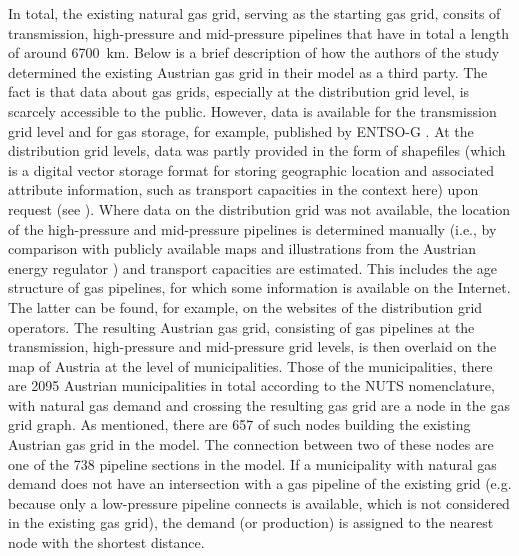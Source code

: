 In total, the existing natural gas grid, serving as the starting gas grid, consits of transmission, high-pressure and mid-pressure pipelines that have in total a length of around \SI{6700}{km}. Below is a brief description of how the authors of the study determined the existing Austrian gas grid in their model as a third party. The fact is that data about gas grids, especially at the distribution grid level, is scarcely accessible to the public. However, data is available for the transmission grid level and for gas storage, for example, published by ENTSO-G \cite{entsog}. At the distribution grid levels, data was partly provided in the form of shapefiles (which is a digital vector storage format for storing geographic location and associated attribute information, such as transport capacities in the context here) upon request (see \cite{zwickl2023design}). Where data on the distribution grid was not available, the location of the high-pressure and mid-pressure pipelines is determined manually (i.e., by comparison with publicly available maps and illustrations from the Austrian energy regulator \cite{econtrol_grid1}) and transport capacities are estimated. This includes the age structure of gas pipelines, for which some information is available on the Internet. The latter can be found, for example, on the websites of the distribution grid operators. The resulting Austrian gas grid, consisting of gas pipelines at the transmission, high-pressure and mid-pressure grid levels, is then overlaid on the map of Austria at the level of municipalities. Those of the municipalities, there are 2095 Austrian municipalities in total according to the NUTS nomenclature, with natural gas demand and crossing the resulting gas grid are a node in the gas grid graph. As mentioned, there are 657 of such nodes building the existing Austrian gas grid in the model. The connection between two of these nodes are one of the 738 pipeline sections in the model. If a municipality with natural gas demand does not have an intersection with a gas pipeline of the existing grid (e.g. because only a low-pressure pipeline connects is available, which is not considered in the existing gas grid), the demand (or production) is assigned to the nearest node with the shortest distance. 

